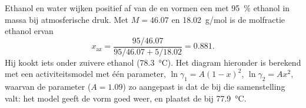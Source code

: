 \begin{example}\label{ex:b2:liquid-vapour-diagrams:ethanol-water}
Ethanol en water wijken positief af van de  en vormen een 
met 95~\% ethanol in massa bij atmosferische druk. Met $M = 46.07$ en
\qty{18.02}{g/mol} is de molfractie ethanol ervan
\[
  x_{\text{az}} = \frac{95/46.07}{95/46.07 + 5/18.02} = 0.881 .
\]
Hij kookt iets onder zuivere ethanol (\qty{78.3}{\degreeCelsius}). Het diagram
hieronder is berekend met een activiteitsmodel met één parameter, $\ln\gamma_1 = A(1 -
x)^2$, $\ln\gamma_2 = Ax^2$, waarvan de parameter ($A = 1.09$) zo aangepast is dat de
 bij die samenstelling valt: het model geeft de vorm goed weer, en
plaatst de  bij \qty{77.9}{\degreeCelsius}.
\end{example}

